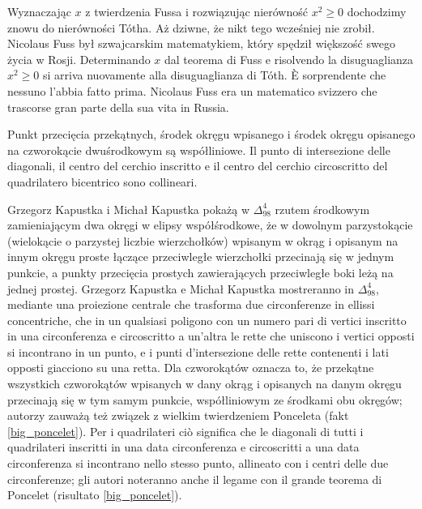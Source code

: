 
Wyznaczając $x$ z twierdzenia Fussa i rozwiązując nierówność $x^2 \ge 0$ dochodzimy znowu do nierówności Tótha. %
Aż dziwne, że nikt tego wcześniej nie zrobił. %
Nicolaus Fuss był szwajcarskim matematykiem, który spędził większość swego życia w Rosji. %
Determinando $x$ dal teorema di Fuss e risolvendo la disuguaglianza $x^2 \ge 0$ si arriva nuovamente alla disuguaglianza di Tóth. %
È sorprendente che nessuno l'abbia fatto prima. %
Nicolaus Fuss era un matematico svizzero che trascorse gran parte della sua vita in Russia. %
%

\begin{proposition}
Punkt przecięcia przekątnych, środek okręgu wpisanego i środek okręgu opisanego na czworokącie dwuśrodkowym są współliniowe. %
Il punto di intersezione delle diagonali, il centro del cerchio inscritto e il centro del cerchio circoscritto del quadrilatero bicentrico sono collineari. %
\end{proposition}
Grzegorz Kapustka i Michał Kapustka pokażą w $\Delta_{98}^{4}$ rzutem środkowym zamieniającym dwa okręgi w elipsy współśrodkowe, że w dowolnym parzystokącie (wielokącie o parzystej liczbie wierzchołków) wpisanym w okrąg i opisanym na innym okręgu proste łączące przeciwległe wierzchołki przecinają się w jednym punkcie, a punkty przecięcia prostych zawierających przeciwległe boki leżą na jednej prostej. %
Grzegorz Kapustka e Michał Kapustka mostreranno in $\Delta_{98}^{4}$, mediante una proiezione centrale che trasforma due circonferenze in ellissi concentriche, che in un qualsiasi poligono con un numero pari di vertici inscritto in una circonferenza e circoscritto a un'altra le rette che uniscono i vertici opposti si incontrano in un punto, e i punti d'intersezione delle rette contenenti i lati opposti giacciono su una retta. %
Dla czworokątów oznacza to, że przekątne wszystkich czworokątów wpisanych w dany okrąg i opisanych na danym okręgu przecinają się w tym samym punkcie, współliniowym ze środkami obu okręgów; autorzy zauważą też związek z wielkim twierdzeniem Ponceleta (fakt \ref{big_poncelet}). %
Per i quadrilateri ciò significa che le diagonali di tutti i quadrilateri inscritti in una data circonferenza e circoscritti a una data circonferenza si incontrano nello stesso punto, allineato con i centri delle due circonferenze; gli autori noteranno anche il legame con il grande teorema di Poncelet (risultato \ref{big_poncelet}). %

